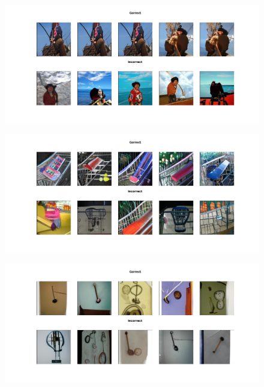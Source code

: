 \documentclass[12pt,a4paper,openany]{book}
\begin{document}
\begin{figure}[ht!]
    \centering
    \includegraphics[scale=0.4]{figs/imagenet_examples/pirate.png}
\end{figure}
\begin{figure}[ht!]
    \centering
    \includegraphics[scale=0.4]{figs/imagenet_examples/shopping cart.png}
\end{figure}
\begin{figure}[ht!]
    \centering
    \includegraphics[scale=0.4]{figs/imagenet_examples/wall clock.png}
\end{figure}
\end{document}
